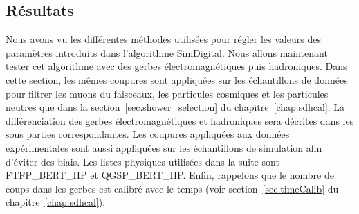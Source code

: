 \subsection{Résultats}
\label{sec.resultats}
Nous avons vu les différentes méthodes utilisées pour régler les valeurs des paramètres introduits dans l'algorithme SimDigital. Nous allons maintenant tester cet algorithme avec des gerbes électromagnétiques puis hadroniques. Dans cette section, les mêmes coupures sont appliquées sur les échantillons de données pour filtrer les muons du faisceaux, les particules cosmiques et les particules neutres que dans la section~\ref{sec.shower_selection} du chapitre~\ref{chap.sdhcal}. La différenciation des gerbes électromagnétiques et hadroniques sera décrites dans les sous parties correspondantes. Les coupures appliquées aux données expérimentales sont aussi appliquées sur les échantillons de simulation afin d'éviter des biais. Les listes physiques utilisées dans la suite sont FTFP\_BERT\_HP et QGSP\_BERT\_HP. Enfin, rappelons que le nombre de coups dans les gerbes est calibré avec le temps (voir section~\ref{sec.timeCalib} du chapitre~\ref{chap.sdhcal}).


